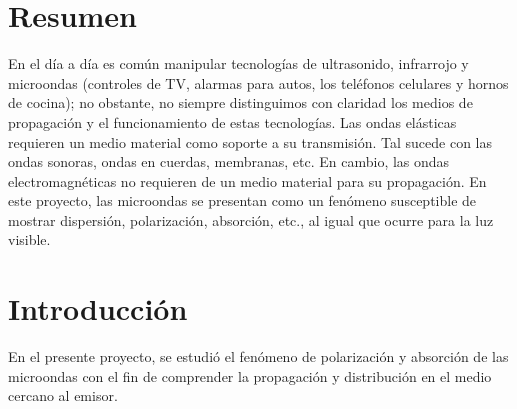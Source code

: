 \documentclass[spanish,notitlepage,letterpaper, 12pt]{article}
\begin{document}

\tableofcontents

\newpage

\section{Resumen}
En el día a día es común manipular tecnologías de ultrasonido, infrarrojo y microondas
(controles de TV, alarmas para autos, los teléfonos celulares y hornos de cocina); no
obstante, no siempre distinguimos con claridad los medios de propagación y el
funcionamiento de estas tecnologías. Las ondas elásticas requieren un medio material
como soporte a su transmisión. Tal sucede con las ondas sonoras, ondas en cuerdas,
membranas, etc. En cambio, las ondas electromagnéticas no requieren de un medio
material para su propagación. En este proyecto, las microondas se presentan como un
fenómeno susceptible de mostrar dispersión, polarización, absorción, etc., al igual que
ocurre para la luz visible.
\section{Introducción}
En el presente proyecto, se estudió el fenómeno de polarización y absorción de las
microondas con el fin de comprender la propagación y distribución en el medio cercano al
emisor.
\end{document}
